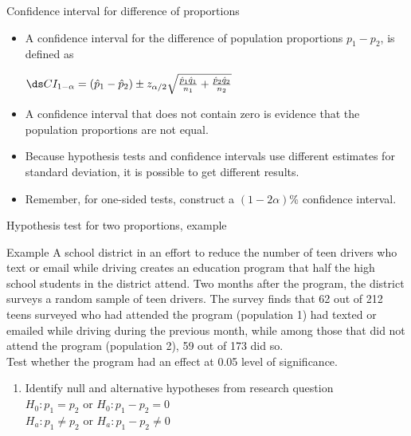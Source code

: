 \documentclass[xcolor=table]{beamer}
\begin{document}
\begin{frame}{Confidence interval for difference of proportions}
\begin{block}{}
\large
\begin{itemize}
\item A confidence interval for the difference of population proportions $p_1 - p_2$, is defined as\\
\smallskip
{\centering $\ds CI_{1-\alpha} = (\hat p_1 - \hat p_2) \pm z_{\alpha/2} \sqrt{\frac {\hat p_1 \hat q_1}{n_1} + \frac {\hat p_2 \hat q_2}{n_2}}$ \par}
\smallskip
\pause\item A confidence interval that does not contain zero is evidence that the population proportions are not equal.

\pause\item Because hypothesis tests and confidence intervals use different estimates for standard deviation, it is possible to get different results.

\pause\item Remember, for one-sided tests, construct a $(1-2\alpha)$\% confidence interval.
\end{itemize}
\end{block}
\end{frame}




\begin{frame}{Hypothesis test for two proportions, example}
\begin{exampleblock}{Example}
\large
A school district in an effort to reduce the number of teen drivers who text or email while driving creates an education program that half the high school students in the district attend. Two months after the program, the district surveys a random sample of teen drivers. The survey finds that 62 out of 212 teens surveyed who had attended the program (population 1) had texted or emailed while driving during the previous month, while among those that did not attend the program (population 2), 59 out of 173 did so.\\
\medskip
Test whether the program had an effect at 0.05 level of significance.
\begin{enumerate}
\pause\item Identify null and alternative hypotheses from research question\\
\pause$H_0: p_1 = p_2$ or $H_0: p_1 - p_2 = 0$\\
$H_a: p_1 \ne p_2$ or $H_a: p_1 - p_2 \ne 0$\\
\end{enumerate}
\end{exampleblock}
\end{frame}
\end{document}
